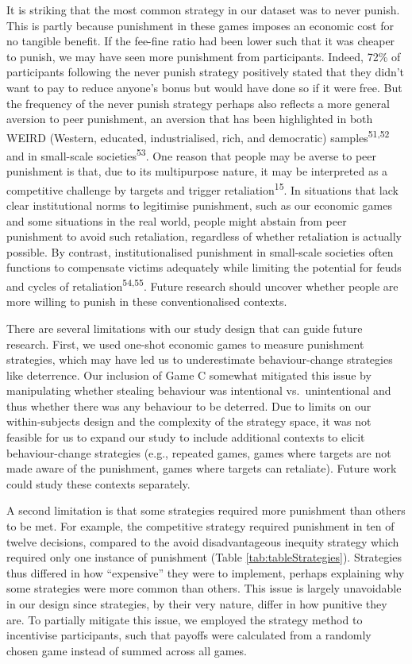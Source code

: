 \documentclass[
  man,floatsintext]{apa6}
\begin{document}
It is striking that the most common strategy in our dataset was to never punish.
This is partly because punishment in these games imposes an economic cost for no
tangible benefit. If the fee-fine ratio had been lower such that it was cheaper
to punish, we may have seen more punishment from participants. Indeed,
72\%
of participants following the never punish strategy positively stated that they
didn't want to pay to reduce anyone's bonus but would have done so if it were
free. But the frequency of the never punish strategy perhaps also reflects a
more general aversion to peer punishment, an aversion that has been highlighted
in both WEIRD (Western, educated, industrialised, rich, and democratic) samples\textsuperscript{51,52} and in small-scale societies\textsuperscript{53}.
One reason that people may be averse to peer punishment is that, due to its
multipurpose nature, it may be interpreted as a competitive challenge by targets
and trigger retaliation\textsuperscript{15}. In situations that lack clear
institutional norms to legitimise punishment, such as our economic games and
some situations in the real world, people might abstain from peer punishment to
avoid such retaliation, regardless of whether retaliation is actually possible.
By contrast, institutionalised punishment in small-scale societies often
functions to compensate victims adequately while limiting the potential for
feuds and cycles of retaliation\textsuperscript{54,55}. Future research
should uncover whether people are more willing to punish in these
conventionalised contexts.

There are several limitations with our study design that can guide future
research. First, we used one-shot economic games to measure punishment
strategies, which may have led us to underestimate behaviour-change strategies
like deterrence. Our inclusion of Game C somewhat mitigated this issue by
manipulating whether stealing behaviour was intentional vs.~unintentional and
thus whether there was any behaviour to be deterred. Due to limits on our
within-subjects design and the complexity of the strategy space, it was not
feasible for us to expand our study to include additional contexts to elicit
behaviour-change strategies (e.g., repeated games, games where targets are not
made aware of the punishment, games where targets can retaliate). Future work
could study these contexts separately.

A second limitation is that some strategies required more punishment than others
to be met. For example, the competitive strategy required punishment in ten of
twelve decisions, compared to the avoid disadvantageous inequity strategy which
required only one instance of punishment (Table \ref{tab:tableStrategies}).
Strategies thus differed in how ``expensive'' they were to implement, perhaps
explaining why some strategies were more common than others. This issue is
largely unavoidable in our design since strategies, by their very nature, differ
in how punitive they are. To partially mitigate this issue, we employed the
strategy method to incentivise participants, such that payoffs were calculated
from a randomly chosen game instead of summed across all games.
\end{document}
